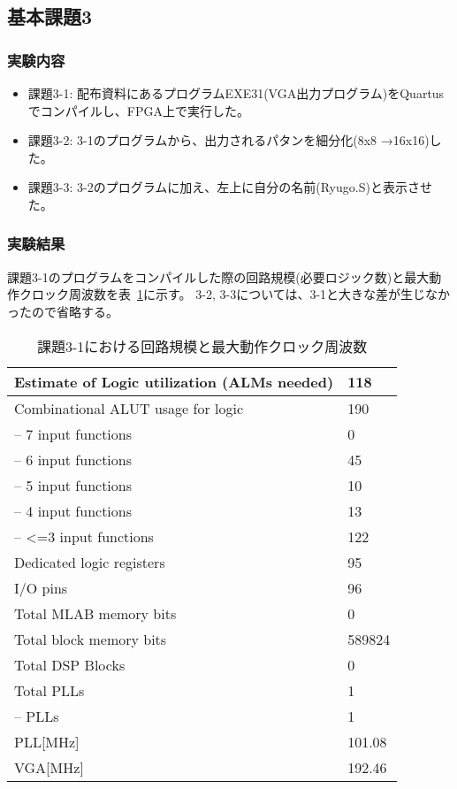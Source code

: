 \subsection{基本課題3}
\subsubsection{実験内容}
\begin{itemize}
    \item 課題3-1: 配布資料にあるプログラムEXE31(VGA出力プログラム)をQuartusでコンパイルし、FPGA上で実行した。
    \item 課題3-2: 3-1のプログラムから、出力されるパタンを細分化(8x8 →16x16)した。
    \item 課題3-3: 3-2のプログラムに加え、左上に自分の名前(Ryugo.S)と表示させた。
\end{itemize}
\subsubsection{実験結果}
課題3-1のプログラムをコンパイルした際の回路規模(必要ロジック数)と最大動作クロック周波数を表~\ref{tab:basic3}に示す。
3-2, 3-3については、3-1と大きな差が生じなかったので省略する。
\begin{table}[h]
    \caption{課題3-1における回路規模と最大動作クロック周波数}\label{tab:basic3}
    \begin{center}
    \begin{tabular}{|l|l|}
        \hline
    Estimate of Logic utilization (ALMs needed) & 118    \\\hline
    Combinational ALUT usage for logic          & 190    \\\hline
    -- 7 input functions                        & 0      \\\hline
    -- 6 input functions                        & 45     \\\hline
    -- 5 input functions                        & 10     \\\hline
    -- 4 input functions                        & 13     \\\hline
    -- \textless{}=3 input functions            & 122    \\\hline
    Dedicated logic registers                   & 95     \\\hline
    I/O pins                                    & 96     \\\hline
    Total MLAB memory bits                      & 0      \\\hline
    Total block memory bits                     & 589824 \\\hline
    Total DSP Blocks                            & 0      \\\hline
    Total PLLs                                  & 1      \\\hline
    -- PLLs                                     & 1     \\\hline
    PLL[MHz] & 101.08\\\hline
    VGA[MHz] & 192.46\\\hline
    \end{tabular}
    \end{center}
\end{table}

